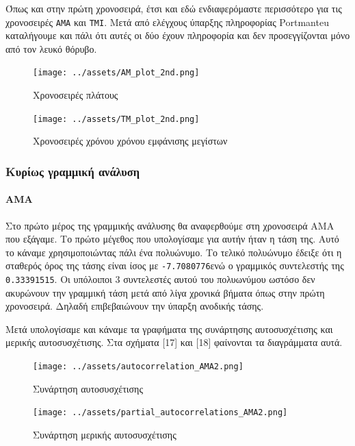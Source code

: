 \documentclass[11pt,]{article}
\let\oldparagraph\paragraph
\renewcommand{\paragraph}[1]{\oldparagraph{#1}\mbox{}}
\begin{document}
Όπως και στην πρώτη χρονοσειρά, έτσι και εδώ ενδιαφερόμαστε περισσότερο
για τις χρονοσειρές \texttt{AMA} και \texttt{TMI}. Μετά από ελέγχους
ύπαρξης πληροφορίας Portmanteu καταλήγουμε και πάλι ότι αυτές οι δύο
έχουν πληροφορία και δεν προσεγγίζονται μόνο από τον λευκό θόρυβο.

\begin{figure}
\centering
\texttt{[image: ../assets/AM\_plot\_2nd.png]}
\caption{Χρονοσειρές πλάτους}
\end{figure}

\begin{figure}
\centering
\texttt{[image: ../assets/TM\_plot\_2nd.png]}
\caption{Χρονοσειρές χρόνου χρόνου εμφάνισης μεγίστων}
\end{figure}

\hypertarget{ux3baux3c5ux3c1ux3afux3c9ux3c2-ux3b3ux3c1ux3b1ux3bcux3bcux3b9ux3baux3ae-ux3b1ux3bdux3acux3bbux3c5ux3c3ux3b7-1}{%
\subsubsection{Κυρίως γραμμική
ανάλυση}\label{ux3baux3c5ux3c1ux3afux3c9ux3c2-ux3b3ux3c1ux3b1ux3bcux3bcux3b9ux3baux3ae-ux3b1ux3bdux3acux3bbux3c5ux3c3ux3b7-1}}

\hypertarget{ama-1}{%
\paragraph{AMA}\label{ama-1}}

Στο πρώτο μέρος της γραμμικής ανάλυσης θα αναφερθούμε στη χρονοσειρά AMA
που εξάγαμε. Το πρώτο μέγεθος που υπολογίσαμε για αυτήν ήταν η τάση της.
Αυτό το κάναμε χρησιμοποιώντας πάλι ένα πολυώνυμο. Το τελικό πολυώνυμο
έδειξε ότι η σταθερός όρος της τάσης είναι ίσος με
\texttt{-7.7080776}ενώ ο γραμμικός συντελεστής της \texttt{0.33391515}.
Οι υπόλοιποι 3 συντελεστές αυτού του πολυωνύμου ωστόσο δεν ακυρώνουν την
γραμμική τάση μετά από λίγα χρονικά βήματα όπως στην πρώτη χρονοσειρά.
Δηλαδή επιβεβαιώνουν την ύπαρξη ανοδικής τάσης.

Μετά υπολογίσαμε και κάναμε τα γραφήματα της συνάρτησης αυτοσυσχέτισης
και μερικής αυτοσυσχέτισης. Στα σχήματα {[}17{]} και {[}18{]} φαίνονται
τα διαγράμματα αυτά.

\begin{figure}
\centering
\texttt{[image: ../assets/autocorrelation\_AMA2.png]}
\caption{Συνάρτηση αυτοσυσχέτισης}
\end{figure}

\begin{figure}
\centering
\texttt{[image: ../assets/partial\_autocorrelations\_AMA2.png]}
\caption{Συνάρτηση μερικής αυτοσυσχέτισης}
\end{figure}
\end{document}
